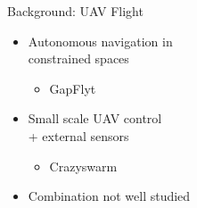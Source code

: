 \documentclass[xcolor=x11names,compress]{beamer}
\begin{document}
\begin{frame}{Background: UAV Flight}
	\vspace{-40pt}
	\begin{itemize}
		\item Autonomous navigation in \\constrained spaces 
		\begin{itemize}
			\item GapFlyt 
		\end{itemize}
		\item Small scale UAV control\\ + external sensors
		\begin{itemize}
			\item Crazyswarm
		\end{itemize}
		\item Combination not well studied
        

\end{itemize}
\end{frame}
\end{document}
